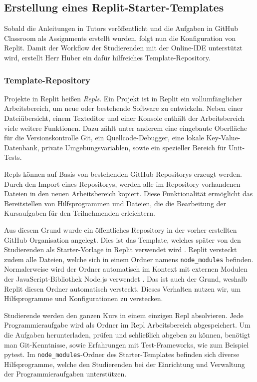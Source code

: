 \newpage

\subsection{Erstellung eines Replit-Starter-Templates}\label{replit-template}
Sobald die Anleitungen in Tutors veröffentlicht und die Aufgaben in GitHub
Classroom als Assignments erstellt wurden, folgt nun die Konfiguration von
Replit. Damit der Workflow der Studierenden mit der Online-IDE unterstützt wird,
erstellt Herr Huber ein dafür hilfreiches Template-Repository.

\subsubsection{Template-Repository}\label{replit-template-repository}
Projekte in Replit heißen \emph{Repls}. Ein Projekt ist in Replit ein
vollumfänglicher Arbeitsbereich, um neue oder bestehende Software zu entwickeln.
Neben einer Dateiübersicht, einem Text\-editor und einer Konsole enthält der
Arbeitsbereich viele weitere Funktionen. Dazu zählt unter anderem eine
eingebaute Oberfläche für die Versionskontrolle Git, ein Quellcode-Debugger,
eine lokale Key-Value-Datenbank, private Umgebungsvariablen, sowie ein
spezieller Bereich für Unit-Tests.

Repls können auf Basis von bestehenden GitHub Repositorys erzeugt werden. Durch
den Import eines Repositorys, werden alle im Repository vorhandenen Dateien
in den neuen Arbeitsbereich kopiert. Diese Funktionalität ermöglicht das
Bereitstellen von Hilfsprogrammen und Dateien, die die Bearbeitung der
Kursaufgaben für den Teilnehmenden erleichtern.

Aus diesem Grund wurde ein öffentliches Repository in der vorher erstellten
GitHub Organisation angelegt. Dies ist das Template, welches später von den
Studierenden als Starter-Vorlage in Replit verwendet wird
\parencite{git-repo:replit-template}. Replit versteckt zudem alle Dateien,
welche sich in einem Ordner namens \texttt{node\_modules} befinden.
Normalerweise wird der Ordner automatisch im Kontext mit externen Modulen der 
JavaScript-Bibliothek Node.js verwendet \parencite{nodejs}. Das ist auch der
Grund, weshalb Replit diesen Ordner automatisch versteckt. Dieses Verhalten
nutzen wir, um Hilfsprogramme und Konfigurationen zu verstecken.

Studierende werden den ganzen Kurs in einem einzigen Repl absolvieren. Jede
Programmieraufgabe wird als Ordner im Repl Arbeitsbereich abgespeichert. Um die
Aufgaben herunterladen, prüfen und schließlich abgeben zu können, benötigt man
Git-Kenntnisse, sowie Erfahrungen mit Test-Frameworks, wie zum Beispiel pytest.
Im \texttt{node\_modules}-Ordner des Starter-Templates befinden sich diverse
Hilfsprogramme, welche den Studierenden bei der Einrichtung und Verwaltung der
Programmieraufgaben unterstützen.

